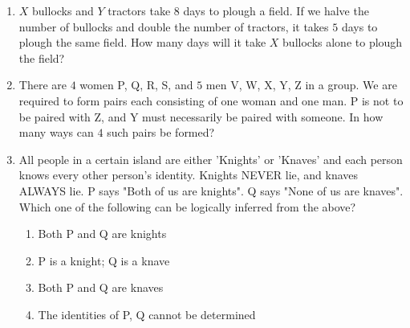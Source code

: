 \documentclass[journal,12pt,onecolumn]{IEEEtran}
\theoremstyle{remark}
\begin{document}
\begin{enumerate}
    \item $X$ bullocks and $Y$ tractors take $8$ days to plough a field. If we halve the number of bullocks and double the number of tractors, it takes $5$ days to plough the same field. How many days will it take $X$ bullocks alone to plough the field? \hfill{}
        \begin{enumerate}
        \end{enumerate}
        
    \item There are $4$ women P, Q, R, S, and $5$ men V, W, X, Y, Z in a group. We are required to form pairs each consisting of one woman and one man. P is not to be paired with Z, and Y must necessarily be paired with someone. In how many ways can $4$ such pairs be formed? \hfill{}
        \begin{enumerate}
        \end{enumerate}
        
    \item All people in a certain island are either 'Knights' or 'Knaves' and each person knows every other person's identity. Knights NEVER lie, and knaves ALWAYS lie.  
    P says "Both of us are knights". Q says "None of us are knaves".  
    Which one of the following can be logically inferred from the above? \hfill{}
        \begin{enumerate}
                \item Both P and Q are knights
                \item P is a knight; Q is a knave
                \item Both P and Q are knaves
                \item The identities of P, Q cannot be determined
        \end{enumerate}
    

\end{enumerate}
\end{document}

